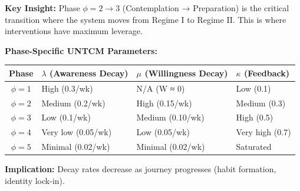 \begin{tcolorbox}[colback=blue!5!white, colframe=blue!75!black,
    title=\textbf{Integration UNTCM-I1: BCJ Journey Phase Mapping}]
\textbf{Key Insight:} Phase $\phi = 2 \to 3$ (Contemplation → Preparation) is the critical transition where the system moves from Regime I to Regime II. This is where interventions have maximum leverage.

\textbf{Phase-Specific UNTCM Parameters:}

\begin{center}
\renewcommand{\arraystretch}{1.2}
\begin{tabular}{@{}clll@{}}
\toprule
\textbf{Phase} & \textbf{$\lambda$ (Awareness Decay)} & \textbf{$\mu$ (Willingness Decay)} & \textbf{$\kappa$ (Feedback)} \\
\midrule
$\phi = 1$ & High (0.3/wk) & N/A (W ≈ 0) & Low (0.1) \\
$\phi = 2$ & Medium (0.2/wk) & High (0.15/wk) & Medium (0.3) \\
$\phi = 3$ & Low (0.1/wk) & Medium (0.10/wk) & High (0.5) \\
$\phi = 4$ & Very low (0.05/wk) & Low (0.05/wk) & Very high (0.7) \\
$\phi = 5$ & Minimal (0.02/wk) & Minimal (0.02/wk) & Saturated \\
\bottomrule
\end{tabular}
\end{center}

\textbf{Implication:} Decay rates decrease as journey progresses (habit formation, identity lock-in).

\end{tcolorbox}

